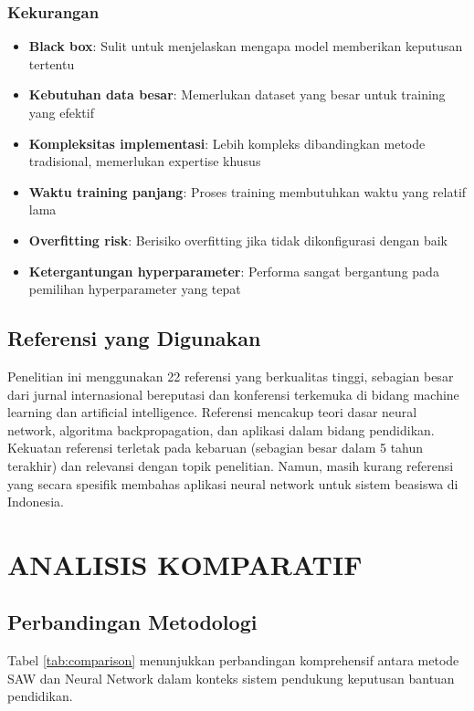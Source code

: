 \documentclass[10pt,a4paper]{article}
\begin{document}
\subsubsection{Kekurangan}
\begin{itemize}
    \item \textbf{Black box}: Sulit untuk menjelaskan mengapa model memberikan keputusan tertentu
    \item \textbf{Kebutuhan data besar}: Memerlukan dataset yang besar untuk training yang efektif
    \item \textbf{Kompleksitas implementasi}: Lebih kompleks dibandingkan metode tradisional, memerlukan expertise khusus
    \item \textbf{Waktu training panjang}: Proses training membutuhkan waktu yang relatif lama
    \item \textbf{Overfitting risk}: Berisiko overfitting jika tidak dikonfigurasi dengan baik
    \item \textbf{Ketergantungan hyperparameter}: Performa sangat bergantung pada pemilihan hyperparameter yang tepat
\end{itemize}

\subsection{Referensi yang Digunakan}

Penelitian ini menggunakan 22 referensi yang berkualitas tinggi, sebagian besar dari jurnal internasional bereputasi dan konferensi terkemuka di bidang machine learning dan artificial intelligence. Referensi mencakup teori dasar neural network, algoritma backpropagation, dan aplikasi dalam bidang pendidikan. Kekuatan referensi terletak pada kebaruan (sebagian besar dalam 5 tahun terakhir) dan relevansi dengan topik penelitian. Namun, masih kurang referensi yang secara spesifik membahas aplikasi neural network untuk sistem beasiswa di Indonesia.

\section{ANALISIS KOMPARATIF}

\subsection{Perbandingan Metodologi}

Tabel \ref{tab:comparison} menunjukkan perbandingan komprehensif antara metode SAW dan Neural Network dalam konteks sistem pendukung keputusan bantuan pendidikan.
\end{document}
